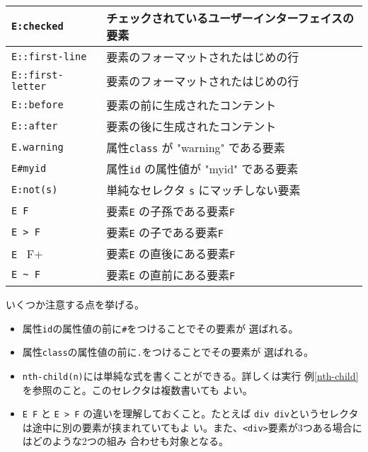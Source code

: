 \begin{longtable}{|m{13em}|m{}|}
\Verb+E:checked+&チェックされているユーザーインターフェイスの要素%
\\\hline
\Verb+E::first-line+&要素のフォーマットされたはじめの行%
\\\hline
\Verb+E::first-letter+&要素のフォーマットされたはじめの行%
\\\hline
\Verb+E::before+&要素の前に生成されたコンテント%
\\\hline
\Verb+E::after+&要素の後に生成されたコンテント%
\\\hline
\Verb+E.warning+&属性\texttt{class} が "warning" である要素%
\\\hline
\Verb+E#myid+&属性\texttt{id} の属性値が "myid" である要素%
\\\hline
\Verb+E:not(s)+&単純なセレクタ \texttt{s} にマッチしない要素%
\\\hline
\Verb+E F+&要素\texttt{E} の子孫である要素\texttt{F}%
\\\hline
\Verb+E > F+&要素\texttt{E} の子である要素\texttt{F}%
\\\hline
\Verb+E + F+&要素\texttt{E} の直後にある要素\texttt{F}%
\\\hline
\Verb+E ~ F+&要素\texttt{E} の直前にある要素\texttt{F}%
\\\hline
\end{longtable}

いくつか注意する点を挙げる。
\begin{itemize}
 \item 属性\texttt{id}の属性値の前に\texttt{\#}をつけることでその要素が
       選ばれる。
 \item 属性\texttt{class}の属性値の前に\texttt{.}をつけることでその要素が
       選ばれる。
 \item \texttt{nth-child(n)}には単純な式を書くことができる。詳しくは実行
       例\ref{nth-child}を参照のこと。このセレクタは複数書いても
       よい。
 \item \Verb+E F+ と \Verb+E > F+ の違いを理解しておくこと。たとえば
       \texttt{div div}というセレクタは途中に別の要素が挟まれていてもよ
       い。また、\texttt{<div>}要素が3つある場合にはどのような2つの組み
       合わせも対象となる。
\end{itemize}

